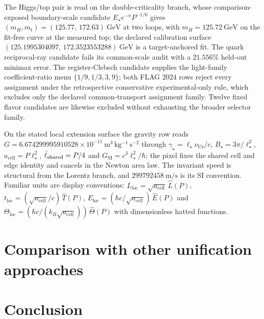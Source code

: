 The Higgs/top pair is read on the double-criticality branch, whose
comparison-exposed boundary-scale candidate \(E_\star e^{-\pi}P^{-1/6}\) gives
\((m_H,m_t)=(125.77,\allowbreak\,172.63)~\mathrm{GeV}\) at two loops, with
\(m_H=125.72~\mathrm{GeV}\) on the fit-free curve at the measured top; the
declared calibration surface
\((125.1995304097,\allowbreak\,172.3523553288)~\mathrm{GeV}\) is a
target-anchored fit. The quark reciprocal-ray candidate fails its common-scale
audit with a \(21.556\%\) held-out minimax error. The register-Clebsch
candidate supplies the light-family coefficient-ratio menu
\(\{1/9,1/3,3,9\}\); both FLAG 2024 rows reject every assignment under the
retrospective conservative experimental-only rule, which excludes only the
declared common-transport assignment family. Twelve fixed flavor candidates
are likewise excluded without exhausting the broader selector family.

On the stated local extension surface the gravity row reads
\(G=6.674299995910528\times10^{-11}~\mathrm{m^3\,kg^{-1}\,s^{-2}}\) through
\(\gamma_\star=\ell_\star\nu_{\mathrm{Cs}}/c\), \(B_\star=3\pi/\ell_\star^2\),
\(a_{\mathrm{cell}}=P\ell_\star^2\), \(\bar{\ell}_{\mathrm{shared}}=P/4\) and
\(G_{\mathrm{SI}}=c^3\ell_\star^2/\hbar\); the pixel fixes the shared cell and
edge identity and cancels in the Newton area law. The invariant speed is
structural from the Lorentz branch, and \(299792458~\mathrm{m/s}\) is its SI
convention. Familiar units are display conventions:
\(L_{\mathrm{loc}}=\sqrt{a_{\mathrm{cell}}}\,\widehat L(P)\),
\(t_{\mathrm{loc}}=(\sqrt{a_{\mathrm{cell}}}/c)\,\widehat T(P)\),
\(E_{\mathrm{loc}}=(\hbar c/\sqrt{a_{\mathrm{cell}}})\,\widehat E(P)\) and
\(\Theta_{\mathrm{loc}}=(\hbar c/(k_B\sqrt{a_{\mathrm{cell}}}))\,\widehat\Theta(P)\)
with dimensionless hatted functions.

\section{Comparison with other unification approaches}
\label{sec:unification-comparison}



\section{Conclusion}

